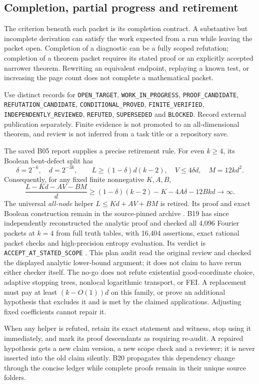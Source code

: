 \documentclass[11pt]{article}
\begin{document}
\subsection{Completion, partial progress and retirement}

The criterion beneath each packet is its completion contract. A substantive but incomplete derivation can satisfy the work expected from a run while leaving the packet open. Completion of a diagnostic can be a fully scoped refutation; completion of a theorem packet requires its stated proof or an explicitly accepted narrower theorem. Rewriting an equivalent endpoint, replaying a known test, or increasing the page count does not complete a mathematical packet.

Use distinct records for \texttt{OPEN\_TARGET}, \texttt{WORK\_IN\_PROGRESS}, \texttt{PROOF\_CANDIDATE}, \texttt{REFUTATION\_CANDIDATE}, \texttt{CONDITIONAL\_PROVED}, \texttt{FINITE\_VERIFIED}, \texttt{INDEPENDENTLY\_REVIEWED}, \texttt{REFUTED}, \texttt{SUPERSEDED} and \texttt{BLOCKED}. Record external publication separately. Finite evidence is not promoted to an all-dimensional theorem, and review is not inferred from a task title or a repository save.

The saved B05 report supplies a precise retirement rule. For even $k\ge4$, its Boolean bent-defect split has
\[
 \delta=2^{-k},\quad d=2^{-3k},\qquad
 L\ge(1-\delta)d(k-2),\quad V\le4\delta d,\quad M=12kd^2.
\]
Consequently, for any fixed finite nonnegative $K,A,B$,
\[
 \frac{L-Kd-AV-BM}{d}
 \ge (1-\delta)(k-2)-K-4A\delta-12Bk d\longrightarrow\infty.
\]
The universal \emph{all-node} helper $L\le Kd+AV+BM$ is retired. Its proof and exact Boolean construction remain in the source-pinned archive \cite{B05NoGo}. B19 has since independently reconstructed the analytic proof and checked all 4,096 Fourier packets at $k=4$ from full truth tables, with 16,404 assertions, exact rational packet checks and high-precision entropy evaluation. Its verdict is \texttt{ACCEPT\_AT\_STATED\_SCOPE} \cite{B19Review}. This plan audit read the original review and checked the displayed analytic lower-bound argument; it does not claim to have rerun either checker itself. The no-go does not refute existential good-coordinate choice, adaptive stopping trees, nonlocal logarithmic transport, or FEI. A replacement must pay at least $(k-O(1))d$ on this family, or prove an additional hypothesis that excludes it and is met by the claimed applications. Adjusting fixed coefficients cannot repair it.

When any helper is refuted, retain its exact statement and witness, stop using it immediately, and mark its proof descendants as requiring re-audit. A repaired hypothesis gets a new claim version, a new scope check and a reviewer; it is never inserted into the old claim silently. B20 propagates this dependency change through the concise ledger while complete proofs remain in their unique source folders.
\end{document}
